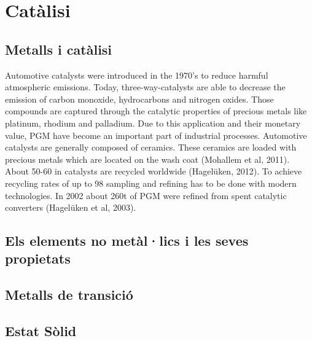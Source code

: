 \chapter{Catàlisi}

\section{Metalls i catàlisi}

\begin{tcolorbox}[colback=green!5,colframe=green!40!black,title= Reciclatge de Platinum Group Metals (PGM)]
Automotive catalysts were introduced in the 1970’s
to reduce harmful atmospheric emissions. Today,
three-way-catalysts are able to decrease the emission
of carbon monoxide, hydrocarbons and nitrogen oxides.
Those compounds are captured through the catalytic
properties of precious metals like platinum, rhodium and
palladium. Due to this application and their monetary
value, PGM have become an important part of industrial
processes. Automotive catalysts are generally composed
of ceramics. These ceramics are loaded with precious
metals which are located on the wash coat (Mohallem et
al, 2011). About 50-60%
in catalysts are recycled worldwide (Hagelüken,
2012). To achieve recycling rates of up to 98%
sampling and refining has to be done with modern technologies.
In 2002 about 260t of PGM were refined from
spent catalytic converters (Hagelüken et al, 2003).
\end{tcolorbox}

\section{Els elements no metàl·lics i les seves propietats}
\section{Metalls de transició}
\section{Estat Sòlid}
